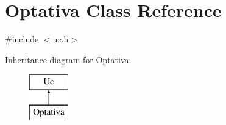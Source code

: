 \hypertarget{class_optativa}{}\section{Optativa Class Reference}
\label{class_optativa}


{\ttfamily \#include $<$uc.\+h$>$}

Inheritance diagram for Optativa\+:\begin{figure}[H]
\begin{center}
\leavevmode
\includegraphics[height=2.000000cm]{class_optativa}
\end{center}
\end{figure}
